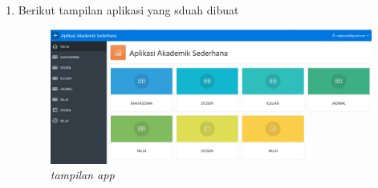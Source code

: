 \begin{enumerate}
   \item Berikut tampilan aplikasi yang sduah dibuat
   
   \begin{figure}[!htbp]
       \centering
       \includegraphics[scale=0.6]{figure/tampilan_app.PNG}
       \caption{\textit{tampilan app}}
       \label{fig:my_label}
   \end{figure}
\end{enumerate}












